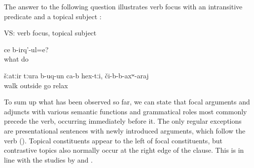 The answer to the following question illustrates verb focus with an intransitive predicate and a topical subject :
%
\begin{exe}
	\ex	VS: verb focus, topical subject	\label{ex:What are (they) doing They went for a walk, to relax}
	\begin{xlist}
		\ex	\label{ex:What are (they) doing Q}
		\gll	ce	b-irq'-ul=e?\\
			what	do\\
		\glt	{}

		\ex	\label{ex:They went for a walk, to relax A}
		\gll	šːatːir	tːura	b-uq-un ca-b	hex-tːi,		či-b-b-axʷ-araj\\
			walk	outside	go			relax\\
		\glt	{}
	\end{xlist}
\end{exe}

To sum up what has been observed so far, we can state that focal arguments and adjuncts with various semantic functions and grammatical roles most commonly precede the verb, occurring immediately before it.  The only regular exceptions are presentational sentences with newly introduced arguments, which follow the verb (). Topical constituents appear to the left of focal constituents, but contrastive topics also normally occur at the right edge of the clause. This is in line with the studies by \citet{Testelec1998a, Testelec1998b} and \citet{Forker.Belyaev2016}.

